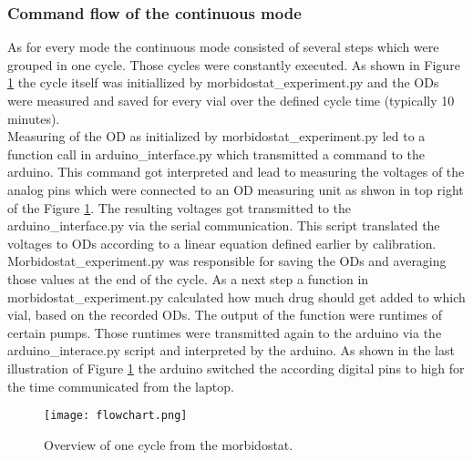 \subsubsection{Command flow of the continuous mode} 
As for every mode the continuous mode consisted of several steps which were grouped in one cycle. Those cycles were constantly executed. As shown in Figure \ref{figure:flowchart} the cycle itself was initiallized by morbidostat\_experiment.py and the ODs were measured and saved for every vial over the defined cycle time (typically 10 minutes). \\
Measuring of the OD as initialized by morbidostat\_experiment.py led to a function call in arduino\_interface.py which transmitted a command to the arduino. This command got interpreted and lead to measuring the voltages of the analog pins which were connected to an OD measuring unit as shwon in top right of the Figure \ref{figure:flowchart}. The resulting voltages got transmitted to the arduino\_interface.py via the serial communication. This script translated the voltages to ODs according to a linear equation defined earlier by calibration. Morbidostat\_experiment.py was responsible for saving the ODs and averaging those values at the end of the cycle. As a next step a function in morbidostat\_experiment.py calculated how much drug should get added to which vial, based on the recorded ODs. The output of the function were runtimes of certain pumps. Those runtimes were transmitted again to the arduino via the arduino\_interace.py script and interpreted by the arduino. As shown in the last illustration of Figure \ref{figure:flowchart} the arduino switched the according digital pins to high for the time communicated from the laptop.
 
\begin{figure}
	\texttt{[image: flowchart.png]}
	\caption{Overview of one cycle from the morbidostat.}
	\label{figure:flowchart}	
\end{figure}

